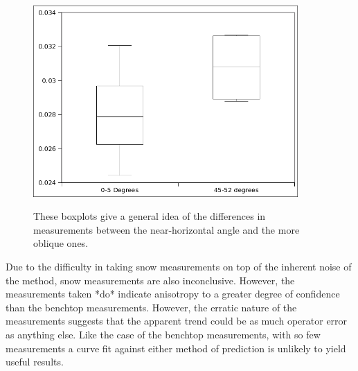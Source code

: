 \begin{figure}[h]
\centering
\includegraphics[width=0.9\textwidth]{fig/snow_meas_boxplot.png}
\label{fig:test_boxplot}
\caption{These boxplots give a general idea of the differences in measurements
between the near-horizontal angle and the more oblique ones.}
\end{figure}


Due to the difficulty in taking snow measurements on top of the inherent noise
of the method, snow measurements are also inconclusive. However, the
measurements taken *do* indicate anisotropy to a greater degree of confidence
than the benchtop measurements. However, the erratic nature of
the measurements suggests that the apparent trend could be as much operator
error as anything else. Like the case of the benchtop measurements, with so few
measurements a curve fit against either method of prediction is unlikely to
yield useful results.
